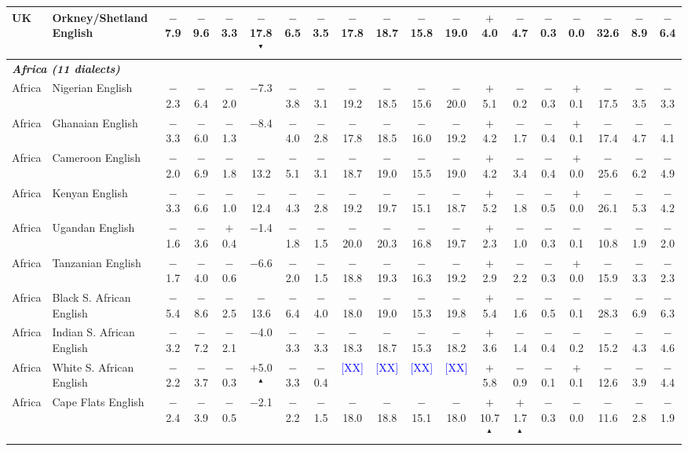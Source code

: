 \begin{table}[t]
\begin{tabular}{llccccccccccccccccc}
UK & Orkney/Shetland English & $-$7.9 & $-$9.6 & $-$3.3 & $-$17.8$^\blacktriangledown$ & $-$6.5 & $-$3.5 & $-$17.8 & $-$18.7 & $-$15.8 & $-$19.0 & $+$4.0 & $-$4.7 & $-$0.3 & $-$0.0 & $-$32.6 & $-$8.9 & $-$6.4 \\
\midrule
\multicolumn{19}{l}{\textit{\textbf{Africa (11 dialects)}}} \\
Africa & Nigerian English & $-$2.3 & $-$6.4 & $-$2.0 & $-$7.3 & $-$3.8 & $-$3.1 & $-$19.2 & $-$18.5 & $-$15.6 & $-$20.0 & $+$5.1 & $-$0.2 & $-$0.3 & $+$0.1 & $-$17.5 & $-$3.5 & $-$3.3 \\
Africa & Ghanaian English & $-$3.3 & $-$6.0 & $-$1.3 & $-$8.4 & $-$4.0 & $-$2.8 & $-$17.8 & $-$18.5 & $-$16.0 & $-$19.2 & $+$4.2 & $-$1.7 & $-$0.4 & $+$0.1 & $-$17.4 & $-$4.7 & $-$4.1 \\
Africa & Cameroon English & $-$2.0 & $-$6.9 & $-$1.8 & $-$13.2 & $-$5.1 & $-$3.1 & $-$18.7 & $-$19.0 & $-$15.5 & $-$19.0 & $+$4.2 & $-$3.4 & $-$0.4 & $+$0.0 & $-$25.6 & $-$6.2 & $-$4.9 \\
Africa & Kenyan English & $-$3.3 & $-$6.6 & $-$1.0 & $-$12.4 & $-$4.3 & $-$2.8 & $-$19.2 & $-$19.7 & $-$15.1 & $-$18.7 & $+$5.2 & $-$1.8 & $-$0.5 & $+$0.0 & $-$26.1 & $-$5.3 & $-$4.2 \\
Africa & Ugandan English & $-$1.6 & $-$3.6 & $+$0.4 & $-$1.4 & $-$1.8 & $-$1.5 & $-$20.0 & $-$20.3 & $-$16.8 & $-$19.7 & $+$2.3 & $-$1.0 & $-$0.3 & $-$0.1 & $-$10.8 & $-$1.9 & $-$2.0 \\
Africa & Tanzanian English & $-$1.7 & $-$4.0 & $-$0.6 & $-$6.6 & $-$2.0 & $-$1.5 & $-$18.8 & $-$19.3 & $-$16.3 & $-$19.2 & $+$2.9 & $-$2.2 & $-$0.3 & $+$0.0 & $-$15.9 & $-$3.3 & $-$2.3 \\
Africa & Black S. African English & $-$5.4 & $-$8.6 & $-$2.5 & $-$13.6 & $-$6.4 & $-$4.0 & $-$18.0 & $-$19.0 & $-$15.3 & $-$19.8 & $+$5.4 & $-$1.6 & $-$0.5 & $-$0.1 & $-$28.3 & $-$6.9 & $-$6.3 \\
Africa & Indian S. African English & $-$3.2 & $-$7.2 & $-$2.1 & $-$4.0 & $-$3.3 & $-$3.3 & $-$18.3 & $-$18.7 & $-$15.3 & $-$18.2 & $+$3.6 & $-$1.4 & $-$0.4 & $-$0.2 & $-$15.2 & $-$4.3 & $-$4.6 \\
Africa & White S. African English & $-$2.2 & $-$3.7 & $-$0.3 & $+$5.0$^\blacktriangle$ & $-$3.3 & $-$0.4 & \textcolor{blue}{[XX]} & \textcolor{blue}{[XX]} & \textcolor{blue}{[XX]} & \textcolor{blue}{[XX]} & $+$5.8 & $-$0.9 & $-$0.1 & $+$0.1 & $-$12.6 & $-$3.9 & $-$4.4 \\
Africa & Cape Flats English & $-$2.4 & $-$3.9 & $-$0.5 & $-$2.1 & $-$2.2 & $-$1.5 & $-$18.0 & $-$18.8 & $-$15.1 & $-$18.0 & $+$10.7$^\blacktriangle$ & $+$1.7$^\blacktriangle$ & $-$0.3 & $-$0.0 & $-$11.6 & $-$2.8 & $-$1.9 \\

\end{tabular}
\end{table}
